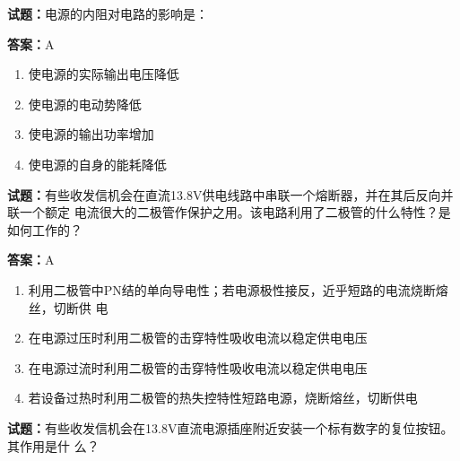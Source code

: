 \documentclass{ctexbook}
\begin{document}




\vspace{1em}

\textbf{试题：}电源的内阻对电路的影响是： 

\textbf{答案：}A 

\begin{enumerate}[leftmargin=3em]
  \item 使电源的实际输出电压降低 

  \item 使电源的电动势降低 

  \item 使电源的输出功率增加 

  \item 使电源的自身的能耗降低 

\end{enumerate}





\vspace{1em}

\textbf{试题：}有些收发信机会在直流13.8V供电线路中串联一个熔断器，并在其后反向并联一个额定
电流很大的二极管作保护之用。该电路利用了二极管的什么特性？是如何工作的？ 

\textbf{答案：}A 

\begin{enumerate}[leftmargin=3em]
  \item 利用二极管中PN结的单向导电性；若电源极性接反，近乎短路的电流烧断熔丝，切断供
电 

  \item 在电源过压时利用二极管的击穿特性吸收电流以稳定供电电压 

  \item 在电源过流时利用二极管的击穿特性吸收电流以稳定供电电压 

  \item 若设备过热时利用二极管的热失控特性短路电源，烧断熔丝，切断供电 

\end{enumerate}





\vspace{1em}

\textbf{试题：}有些收发信机会在13.8V直流电源插座附近安装一个标有数字的复位按钮。其作用是什
么？ 
\end{document}
